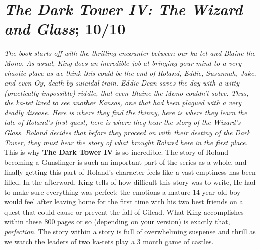 \documentclass[12pt]{article}
\newcommand{\booktitle}[1]{\textbf{\textit{#1}}} %
\newcommand{\review}[1]{\textit{#1}}              %
\begin{document}
\section*{\booktitle{The Dark Tower IV: The Wizard and Glass}; \textbf{10/10}}
\review{The book starts off with the thrilling encounter between our ka-tet and Blaine the Mono. 
As usual, King does an incredible job at bringing your mind to a very chaotic place as we think 
this could be the end of Roland, Eddie, Susannah, Jake, and even Oy, death by suicidal train. 
Eddie Dean saves the day with a witty (practically impossible) riddle, that even Blaine the Mono 
couldn't solve. Thus, the ka-tet lived to see another Kansas, one that had been plagued with a 
very deadly disease. Here is where they find the thinny, here is where they learn the tale of Roland's 
first quest, here is where they hear the story of the Wizard's Glass. Roland decides that before they 
proceed on with their destiny of the Dark Tower, they must hear the story of what brought Roland here 
in the first place.} 
\\
This is why \textbf{The Dark Tower IV} is so incredible. The story of Roland becoming a Gunslinger is 
such an important part of the series as a whole, and finally getting this part of Roland's character 
feels like a vast emptiness has been filled. In the afterword, King tells of how difficult this 
story was to write, He had to make sure everything was perfect; the emotions a mature 14 year old boy 
would feel after leaving home for the first time with his two best friends on a quest that could cause 
or prevent the fall of Gilead. What King accomplishes within these 800 pages or so (depending on your 
version) is exactly that, \textit{perfection}. The story within a story is full of overwhelming suspense 
and thrill as we watch the leaders of two ka-tets play a 3 month game of castles.

\end{document}
